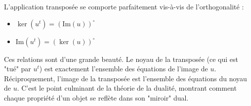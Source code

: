 \begin{theorem}
    L'application transposée se comporte parfaitement vis-à-vis de l'orthogonalité :
    \begin{itemize}
        \item $\ker(u^t) = (\mathrm{Im}(u))^\circ$
        \item $\mathrm{Im}(u^t) = (\ker(u))^\circ$
    \end{itemize}
\end{theorem}

\begin{remark}
    Ces relations sont d'une grande beauté. Le noyau de la transposée (ce qui est "tué" par $u^t$) est exactement l'ensemble des équations de l'image de $u$. Réciproquement, l'image de la transposée est l'ensemble des équations du noyau de $u$. C'est le point culminant de la théorie de la dualité, montrant comment chaque propriété d'un objet se reflète dans son "miroir" dual.
\end{remark}